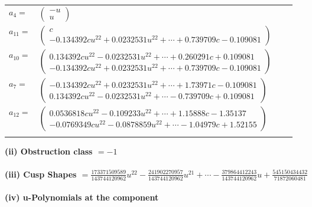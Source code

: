\documentclass[1p]{elsarticle_modified}
\theoremstyle{definition}
\begin{document}
\begin{tabular}{m{7pt} m{180pt} m{7pt} m{180pt} }
\flushright $a_{4}=$&$\begin{pmatrix}- u\\u\end{pmatrix}$ \\
\flushright $a_{11}=$&$\begin{pmatrix}c\\-0.134392 c u^{22}+0.0232531 u^{22}+\cdots+0.739709 c-0.109081\end{pmatrix}$ \\
\flushright $a_{10}=$&$\begin{pmatrix}0.134392 c u^{22}-0.0232531 u^{22}+\cdots+0.260291 c+0.109081\\-0.134392 c u^{22}+0.0232531 u^{22}+\cdots+0.739709 c-0.109081\end{pmatrix}$ \\
\flushright $a_{7}=$&$\begin{pmatrix}-0.134392 c u^{22}+0.0232531 u^{22}+\cdots+1.73971 c-0.109081\\0.134392 c u^{22}-0.0232531 u^{22}+\cdots-0.739709 c+0.109081\end{pmatrix}$ \\
\flushright $a_{12}=$&$\begin{pmatrix}0.0536818 c u^{22}-0.109233 u^{22}+\cdots+1.15888 c-1.35137\\-0.0769349 c u^{22}-0.0878859 u^{22}+\cdots-1.04979 c+1.52155\end{pmatrix}$\\&\end{tabular}
\flushleft \textbf{(ii) Obstruction class $= -1$}\\~\\
\flushleft \textbf{(iii) Cusp Shapes $= \frac{173371509589}{143744120962} u^{22}-\frac{241902270957}{143744120962} u^{21}+\cdots-\frac{379864412243}{143744120962} u+\frac{545150434432}{71872060481}$}\\~\\
\newpage\renewcommand{\arraystretch}{1}
\flushleft \textbf{(iv) u-Polynomials at the component}\newline \\
\end{document}
